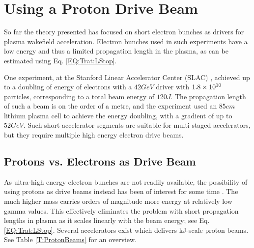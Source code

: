 \section{Using a Proton Drive Beam}
\label{Int:DBeam}

So far the theory presented has focused on short electron bunches as drivers for plasma wakefield acceleration. Electron bunches used in such experiments have a low energy and thus a limited propagation length in the plasma, as can be estimated using Eq. \ref{EQ:Trat:LStop}.

One experiment, at the Stanford Linear Accelerator Center (SLAC) \cite{blumenfeld:2007}, achieved up to a doubling of energy of electrons with a $42\unit{GeV}$ driver with $1.8\times 10^{10}$ particles, corresponding to a total beam energy of $120\unit{J}$. The propagation length of such a beam is on the order of a metre, and the experiment used an $85\unit{cm}$ lithium plasma cell to achieve the energy doubling, with a gradient of up to $52\unit{GeV}$. Such short accelerator segments are suitable for multi staged accelerators, but they require multiple high energy electron drive beams. 

\subsection{Protons vs. Electrons as Drive Beam}
\label{Int:DBeam:PDPWFA}

As ultra-high energy electron bunches are not readily available, the possibility of using protons as drive beams instead has been of interest for some time \cite{blue:2003,caldwell:2009}. The much higher mass carries orders of magnitude more energy at relatively low gamma values. This effectively eliminates the problem with short propagation lengths in plasma as it scales linearly with the beam energy; see Eq. \ref{EQ:Trat:LStop}. Several accelerators exist which delivers kJ-scale proton beams. See Table \ref{T:ProtonBeams} for an overview.

